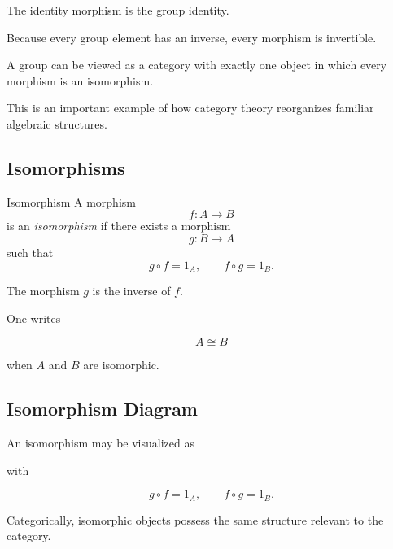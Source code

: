 The identity morphism is the group identity.

Because every group element has an inverse, every morphism is invertible.

\begin{conceptbox}
A group can be viewed as a category with exactly one object in which every
morphism is an isomorphism.
\end{conceptbox}

This is an important example of how category theory reorganizes familiar
algebraic structures.

\subsection{Isomorphisms}
\label{subsec:categorical-isomorphisms}

\begin{definitionbox}{Isomorphism}
A morphism
\[ f:A\to B \]
is an \emph{isomorphism} if there exists a morphism
\[ g:B\to A \]
such that
\[ g\circ f=1_A,\qquad f\circ g=1_B. \]
\end{definitionbox}

The morphism \(g\) is the inverse of \(f\).

One writes

\[ A\cong B \]

when \(A\) and \(B\) are isomorphic.

\subsection{Isomorphism Diagram}
\label{subsec:isomorphism-diagram}

An isomorphism may be visualized as

\begin{center}
\end{center}

with

\[ g\circ f=1_A,\qquad f\circ g=1_B. \]

Categorically, isomorphic objects possess the same structure relevant to the
category.

